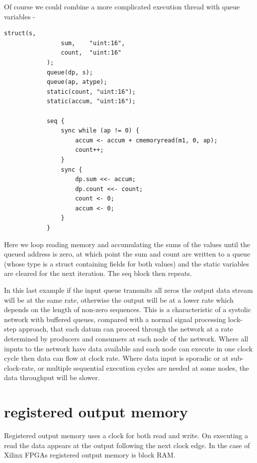         Of course we could combine a more complicated execution thread
        with queue variables -
        \pagebreak
        \begin{lstlisting}[language=threepl]
            struct(s,
                sum,    "uint:16",
                count,  "uint:16"
            );
            queue(dp, s);
            queue(ap, atype);
            static(count, "uint:16");
            static(accum, "uint:16");

            seq {
                sync while (ap != 0) {
                    accum <- accum + cmemoryread(m1, 0, ap);
                    count++;
                }
                sync {
                    dp.sum <<- accum;
                    dp.count <<- count;
                    count <- 0;
                    accum <- 0;
                }
            }
        \end{lstlisting}
        Here we loop reading memory and accumulating the sums of the values until
        the queued address is zero, at which point the sum and count are written
        to a queue (whose type is a struct containing fields for both values) and
        the static variables are cleared for the next iteration. The seq block then
        repeats.

        In this last example if the input queue  transmits all zeros the
        output data stream  will be at the same rate, otherwise the output
        will be at a lower rate which depends on the length of non-zero sequences.
        This is a characteristic of a systolic network with buffered queues, compared
        with a normal signal processing lock-step approach, that each datum can
        proceed through the network at a rate determined by producers and consumers
        at each node of the network. Where all inputs to the network have data available
        and each node can execute in one clock cycle then data can flow at clock rate.
        Where data input is sporadic or at sub-clock-rate, or multiple sequential
        execution cycles are needed at some nodes, the data throughput will be slower.




    \section{registered output memory}

        Registered output memory uses a clock for both read and write. On executing a
        read the data appears at the output following the next clock edge. In the case
        of Xilinx FPGAs registered output memory is block RAM.

